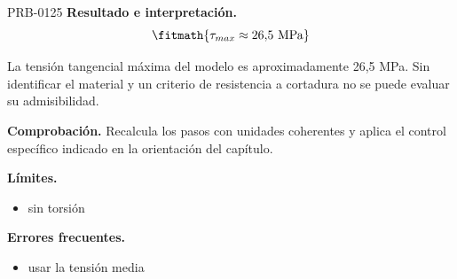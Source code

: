 \begin{studiumworked}{PRB-0125}
\textbf{Resultado e interpretación.}\[\fitmath{\tau_{max} \approx 26{,}5\ \mathrm{MPa}}\]

La tensión tangencial máxima del modelo es aproximadamente 26,5 MPa. Sin identificar el material y un criterio de resistencia a cortadura no se puede evaluar su admisibilidad.

\par\textbf{Comprobación.} Recalcula los pasos con unidades coherentes y aplica el control específico indicado en la orientación del capítulo.

\textbf{Límites.}\begin{itemize}\item sin torsión\end{itemize}

\textbf{Errores frecuentes.}\begin{itemize}\item usar la tensión media\end{itemize}

\end{studiumworked}

\Needspace{.3\textheight}

